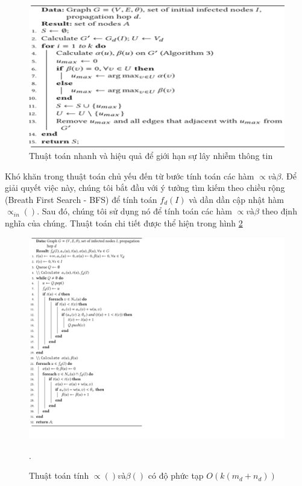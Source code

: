 		\begin{center}
			\begin{figure}[htp]
				\begin{center}
					\includegraphics [scale=.65]{picture/thuattoan1}
				\end{center}
				\caption{Thuật toán nhanh và hiệu quả để giới hạn sự lây nhiễm thông tin}
				\label{refthuattoan1}
			\end{figure}
		\end{center}
	
		Khó khăn trong thuật toán chủ yếu đến từ bước tính toán các hàm $\propto và \beta$. Để giải quyết việc này, chúng tôi bắt đầu với ý tưởng tìm kiếm theo chiều rộng (Breath First Search - BFS) để tính toán $f_{d}(I)$ và dần dần cập nhật hàm $\propto_{in}()$. Sau đó, chúng tôi sử dụng nó để tính toán các hàm  $\propto và \beta$ theo định nghĩa của chúng. Thuật toán chi tiết được thể hiện trong hình \ref{refthuattoan2}
		\begin{center}
			\begin{figure}[htp]
				\begin{center}
					\includegraphics [scale=.5]{picture/thuattoan2}
				\end{center}
				\caption{Thuật toán tính $\propto() và \beta()$ có độ phức tạp $O(k(m_{d} + n_{d}))$}.
				\label{refthuattoan2}
			\end{figure}
		\end{center}
	
